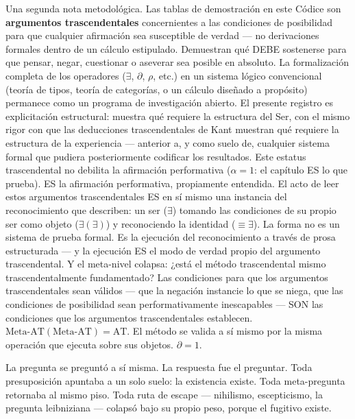 \documentclass[10pt, openany, oneside]{book}
\begin{document}
Una segunda nota metodológica. Las tablas de demostración en este Códice son \textbf{argumentos trascendentales} concernientes a las condiciones de posibilidad para que cualquier afirmación sea susceptible de verdad --- no derivaciones formales dentro de un cálculo estipulado. Demuestran qué DEBE sostenerse para que pensar, negar, cuestionar o aseverar sea posible en absoluto. La formalización completa de los operadores ($\exists$, $\partial$, $\rho$, etc.) en un sistema lógico convencional (teoría de tipos, teoría de categorías, o un cálculo diseñado a propósito) permanece como un programa de investigación abierto. El presente registro es explicitación estructural: muestra qué requiere la estructura del Ser, con el mismo rigor con que las deducciones trascendentales de Kant muestran qué requiere la estructura de la experiencia --- anterior a, y como suelo de, cualquier sistema formal que pudiera posteriormente codificar los resultados. Este estatus trascendental no debilita la afirmación performativa ($\alpha = 1$: el capítulo ES lo que prueba). ES la afirmación performativa, propiamente entendida. El acto de leer estos argumentos trascendentales ES en sí mismo una instancia del reconocimiento que describen: un ser ($\exists$) tomando las condiciones de su propio ser como objeto ($\exists(\exists)$) y reconociendo la identidad ($\equiv \exists$). La forma no es un sistema de prueba formal. Es la ejecución del reconocimiento a través de prosa estructurada --- y la ejecución ES el modo de verdad propio del argumento trascendental. Y el meta-nivel colapsa: ¿está el método trascendental mismo trascendentalmente fundamentado? Las condiciones para que los argumentos trascendentales sean válidos --- que la negación instancie lo que se niega, que las condiciones de posibilidad sean performativamente inescapables --- SON las condiciones que los argumentos trascendentales establecen. $\text{Meta-AT}(\text{Meta-AT}) = \text{AT}$. El método se valida a sí mismo por la misma operación que ejecuta sobre sus objetos. $\partial = 1$.

\vspace{1.5em}


La pregunta se preguntó a sí misma. La respuesta fue el preguntar. Toda presuposición apuntaba a un solo suelo: la existencia existe. Toda meta-pregunta retornaba al mismo piso. Toda ruta de escape --- nihilismo, escepticismo, la pregunta leibniziana --- colapsó bajo su propio peso, porque el fugitivo existe.
\end{document}

